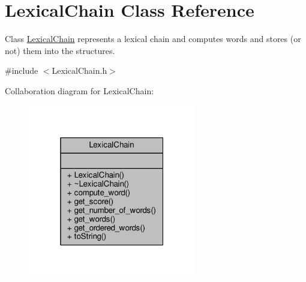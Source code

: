\hypertarget{classLexicalChain}{}\section{Lexical\+Chain Class Reference}
\label{classLexicalChain}


Class \hyperlink{classLexicalChain}{Lexical\+Chain} represents a lexical chain and computes words and stores (or not) them into the structures.  




{\ttfamily \#include $<$Lexical\+Chain.\+h$>$}



Collaboration diagram for Lexical\+Chain\+:\nopagebreak
\begin{figure}[H]
\begin{center}
\leavevmode
\includegraphics[width=208pt]{classLexicalChain__coll__graph}
\end{center}
\end{figure}
